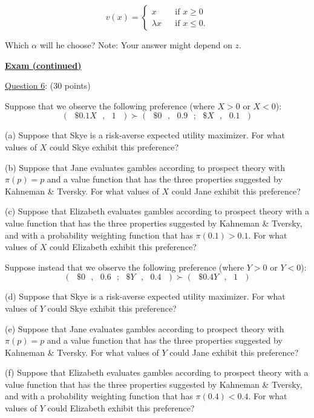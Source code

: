 \documentclass[12pt]{article}
\theoremstyle{definition}
\begin{document}
\[
v(x)=\left\{ 
\begin{array}{ccc}
x &  & \text{if }x\geq 0 \\ 
\lambda x &  & \text{if }x\leq 0.%
\end{array}%
\right. 
\]

Which $\alpha $ will he choose? Note: Your answer might
depend on $z$.

\pagebreak

\begin{center}
\underline{\textbf{Exam (continued)}}
\end{center}

\underline{Question 6}: (30 points)

\bigskip 
 

Suppose that we observe the following preference (where $X>0$ or $X<0$):%
\[
\left( \text{ }\$0.1X\text{ },\text{ }1\text{ }\right) \succ (\text{ }\$0%
\text{ },\text{ }0.9\text{ };\text{ }\$X\text{ },\text{ }0.1\text{ }) 
\]

(a) Suppose that Skye is a risk-averse expected utility maximizer. For what
values of $X$ could Skye exhibit this preference?

(b) Suppose that Jane evaluates gambles according to prospect theory with $%
\pi (p)=p$ and a value function that has the three properties suggested by
Kahneman \& Tversky. For what values of $X$ could Jane exhibit this
preference?

(c) Suppose that Elizabeth evaluates gambles according to prospect theory
with a value function that has the three properties suggested by Kahneman \&
Tversky, and with a probability weighting function that has $\pi (0.1)>0.1$.
For what values of $X$ could Elizabeth exhibit this preference?

\bigskip

Suppose instead that we observe the following preference (where $Y>0$ or $Y<0
$):%
\[
(\text{ }\$0\text{ },\text{ }0.6\text{ };\text{ }\$Y\text{ },\text{ }0.4%
\text{ })\succ \left( \text{ }\$0.4Y\text{ },\text{ }1\text{ }\right) 
\]

(d) Suppose that Skye is a risk-averse expected utility maximizer. For what
values of $Y$ could Skye exhibit this preference?

(e) Suppose that Jane evaluates gambles according to prospect theory with $%
\pi (p)=p$ and a value function that has the three properties suggested by
Kahneman \& Tversky. For what values of $Y$ could Jane exhibit this
preference?

(f) Suppose that Elizabeth evaluates gambles according to prospect theory
with a value function that has the three properties suggested by Kahneman \&
Tversky, and with a probability weighting function that has $\pi (0.4)<0.4$.
For what values of $Y$ could Elizabeth exhibit this preference?
\end{document}
